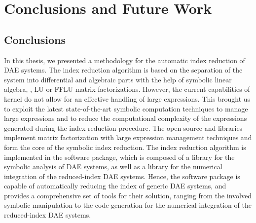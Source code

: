 
\chapter{Conclusions and Future Work}
\label{chap5:conclusions}

\section{Conclusions}

In this thesis, we presented a methodology for the automatic index reduction of \ac{DAE} systems. The index reduction algorithm is based on the separation of the system into differential and algebraic parts with the help of symbolic linear algebra, \ie{}, \ac{LU} or \ac{FFLU} matrix factorizations. However, the current capabilities of \Maple{} kernel do not allow for an effective handling of large expressions. This brought us to exploit the latest state-of-the-art symbolic computation techniques to manage large expressions and to reduce the computational complexity of the expressions generated during the index reduction procedure. The open-source \LEM{} and \LAST{} libraries implement matrix factorization with large expression management techniques and form the core of the symbolic index reduction. The index reduction algorithm is implemented in the \Indigo{} software package, which is composed of a \Maple{} library for the symbolic analysis of \ac{DAE} systems, as well as a \Matlab{} library for the numerical integration of the reduced-index \ac{DAE} systems. Hence, the \Indigo{} software package is capable of automatically reducing the index of generic \ac{DAE} systems, and provides a comprehensive set of tools for their solution, ranging from the involved symbolic manipulation to the \Matlab{} code generation for the numerical integration of the reduced-index \ac{DAE} systems.

